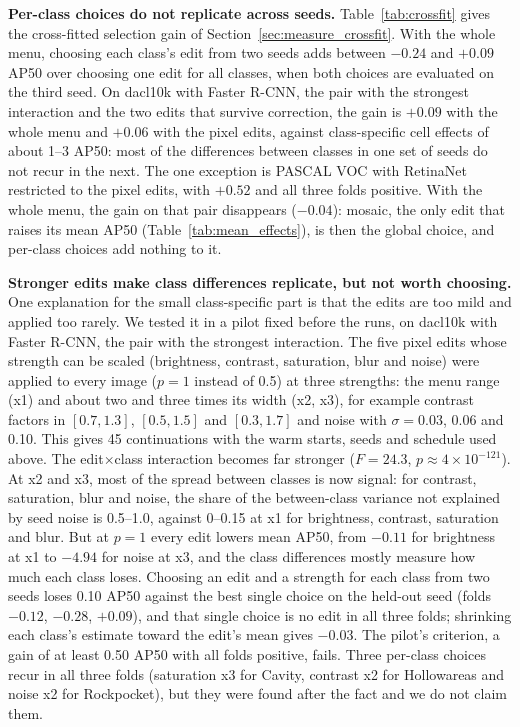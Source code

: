 \documentclass[conference]{IEEEtran}
\begin{document}
\noindent\textbf{Per-class choices do not replicate across seeds.} Table~\ref{tab:crossfit} gives the cross-fitted selection gain of Section~\ref{sec:measure_crossfit}. With the whole menu, choosing each class's edit from two seeds adds between $-0.24$ and $+0.09$ AP50 over choosing one edit for all classes, when both choices are evaluated on the third seed. On dacl10k with Faster R-CNN, the pair with the strongest interaction and the two edits that survive correction, the gain is $+0.09$ with the whole menu and $+0.06$ with the pixel edits, against class-specific cell effects of about 1--3 AP50: most of the differences between classes in one set of seeds do not recur in the next. The one exception is PASCAL VOC with RetinaNet restricted to the pixel edits, with $+0.52$ and all three folds positive. With the whole menu, the gain on that pair disappears ($-0.04$): mosaic, the only edit that raises its mean AP50 (Table~\ref{tab:mean_effects}), is then the global choice, and per-class choices add nothing to it.

\noindent\textbf{Stronger edits make class differences replicate, but not worth choosing.} One explanation for the small class-specific part is that the edits are too mild and applied too rarely. We tested it in a pilot fixed before the runs, on dacl10k with Faster R-CNN, the pair with the strongest interaction. The five pixel edits whose strength can be scaled (brightness, contrast, saturation, blur and noise) were applied to every image ($p=1$ instead of 0.5) at three strengths: the menu range (x1) and about two and three times its width (x2, x3), for example contrast factors in $[0.7,1.3]$, $[0.5,1.5]$ and $[0.3,1.7]$ and noise with $\sigma=0.03$, 0.06 and 0.10. This gives 45 continuations with the warm starts, seeds and schedule used above. The edit$\times$class interaction becomes far stronger ($F=24.3$, $p\approx4\times10^{-121}$). At x2 and x3, most of the spread between classes is now signal: for contrast, saturation, blur and noise, the share of the between-class variance not explained by seed noise is 0.5--1.0, against 0--0.15 at x1 for brightness, contrast, saturation and blur. But at $p=1$ every edit lowers mean AP50, from $-0.11$ for brightness at x1 to $-4.94$ for noise at x3, and the class differences mostly measure how much each class loses. Choosing an edit and a strength for each class from two seeds loses 0.10 AP50 against the best single choice on the held-out seed (folds $-0.12$, $-0.28$, $+0.09$), and that single choice is no edit in all three folds; shrinking each class's estimate toward the edit's mean gives $-0.03$. The pilot's criterion, a gain of at least 0.50 AP50 with all folds positive, fails. Three per-class choices recur in all three folds (saturation x3 for Cavity, contrast x2 for Hollowareas and noise x2 for Rockpocket), but they were found after the fact and we do not claim them.
\end{document}
